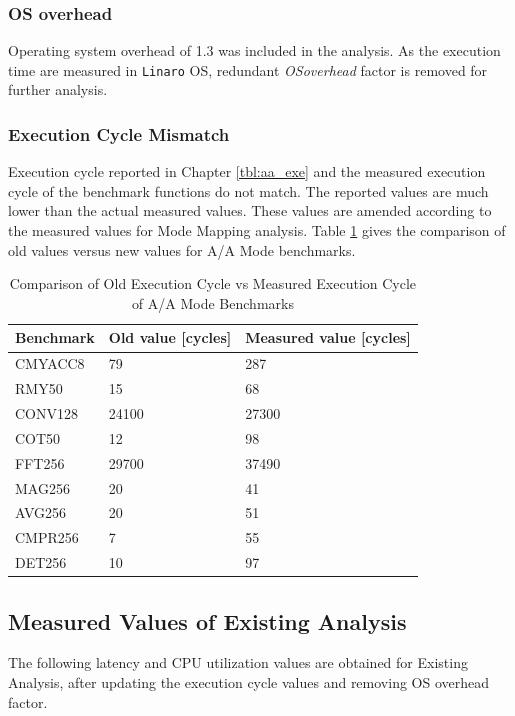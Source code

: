 \subsubsection{OS overhead}
Operating system overhead of 1.3 was included in the analysis. As the execution time are measured in \verb|Linaro| OS, redundant \textsl{OSoverhead} factor is removed for further analysis.

\subsubsection{Execution Cycle Mismatch}
\label{mm:cons:exe_cyl_mismatch}
Execution cycle reported in Chapter \ref{tbl:aa_exe} and the measured execution cycle of the benchmark functions do not match. The reported values are much lower than the actual measured values. These values are amended according to the measured values for Mode Mapping analysis. Table \ref{tbl:mm:aa_real_exe_cycle} gives the comparison of old values versus new values for A/A Mode benchmarks.

\begin{table}[h!]
	\centering
	\begin{tabular}{|l|l|l|} 
	 \hline
	 \textbf{Benchmark} & \textbf{Old value [cycles]} & \textbf{Measured value [cycles]} \\
	 \hline
	 CMYACC8 & 79 & 287 \\ \hline
	 RMY50 & 15 & 68 \\ \hline
	 CONV128 & 24100 & 27300 \\ \hline
	 COT50 & 12 & 98 \\ \hline
	 FFT256 & 29700 & 37490 \\ \hline
	 MAG256 & 20 & 41 \\ \hline
	 AVG256 & 20 & 51 \\ \hline
	 CMPR256 & 7 & 55 \\ \hline
	 DET256 & 10 & 97 \\ \hline
	\end{tabular}
	\caption{Comparison of Old Execution Cycle vs Measured Execution Cycle of A/A Mode Benchmarks}
	\label{tbl:mm:aa_real_exe_cycle}
\end{table}

\FloatBarrier
\subsection{Measured Values of Existing Analysis}
\label{mm:cons:real_values}

The following latency and CPU utilization values are obtained for Existing Analysis, after updating the execution cycle values and removing OS overhead factor.

